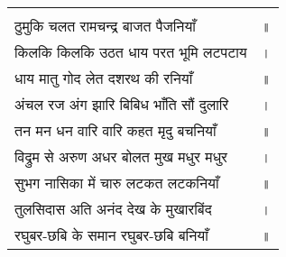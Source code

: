 {\bfseries
\setlength{\mylenone}{0pt}
\settowidth{\mylentwo}{ठुमुकि चलत रामचन्द्र बाजत पैजनियाँ}
\setlength{\mylenone}{\maxof{\mylenone}{\mylentwo}}
\settowidth{\mylentwo}{किलकि किलकि उठत धाय परत भूमि लटपटाय}
\setlength{\mylenone}{\maxof{\mylenone}{\mylentwo}}
\settowidth{\mylentwo}{धाय मातु गोद लेत दशरथ की रनियाँ}
\setlength{\mylenone}{\maxof{\mylenone}{\mylentwo}}
\settowidth{\mylentwo}{अंचल रज अंग झारि बिबिध भाँति सौं दुलारि}
\setlength{\mylenone}{\maxof{\mylenone}{\mylentwo}}
\settowidth{\mylentwo}{तन मन धन वारि वारि कहत मृदु बचनियाँ}
\setlength{\mylenone}{\maxof{\mylenone}{\mylentwo}}
\settowidth{\mylentwo}{विद्रुम से अरुण अधर बोलत मुख मधुर मधुर}
\setlength{\mylenone}{\maxof{\mylenone}{\mylentwo}}
\settowidth{\mylentwo}{सुभग नासिका में चारु लटकत लटकनियाँ}
\setlength{\mylenone}{\maxof{\mylenone}{\mylentwo}}
\settowidth{\mylentwo}{तुलसिदास अति अनंद देख के मुखारबिंद}
\setlength{\mylenone}{\maxof{\mylenone}{\mylentwo}}
\settowidth{\mylentwo}{रघुबर-छबि के समान रघुबर-छबि बनियाँ}
\setlength{\mylenone}{\maxof{\mylenone}{\mylentwo}}
\setlength{\mylentwo}{\baselineskip}
\setlength{\mylenone}{\mylenone + 1pt}
\begin{longtable}[l]{@{\hspace*{\mylen}}>{\setlength\parfillskip{0pt}}p{\mylenone}@{}@{}l@{}}
 & \\[-\the\mylentwo]
ठुमुकि चलत रामचन्द्र बाजत पैजनियाँ & ॥\\ \nopagebreak
किलकि किलकि उठत धाय परत भूमि लटपटाय & ।\\ \nopagebreak
धाय मातु गोद लेत दशरथ की रनियाँ & ॥\\
अंचल रज अंग झारि बिबिध भाँति सौं दुलारि & ।\\ \nopagebreak
तन मन धन वारि वारि कहत मृदु बचनियाँ & ॥\\
विद्रुम से अरुण अधर बोलत मुख मधुर मधुर & ।\\ \nopagebreak
सुभग नासिका में चारु लटकत लटकनियाँ & ॥\\
तुलसिदास अति अनंद देख के मुखारबिंद & ।\\ \nopagebreak
रघुबर-छबि के समान रघुबर-छबि बनियाँ & ॥
\end{longtable}
}
